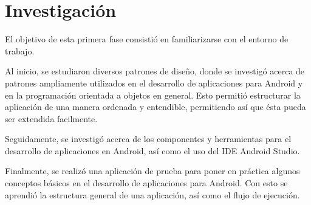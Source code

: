 \section{Investigación} \label{sect:Investigacion}

El objetivo de esta primera fase consistió en familiarizarse con el entorno de trabajo.

Al inicio, se estudiaron diversos patrones de diseño, donde se investigó acerca de patrones ampliamente utilizados en el desarrollo de aplicaciones para Android y en la programación orientada a objetos en general. Esto permitió estructurar la aplicación de una manera ordenada y entendible, permitiendo así que ésta pueda ser extendida facilmente.

Seguidamente, se investigó acerca de los componentes y herramientas para el desarrollo de aplicaciones en Android, así como el uso del IDE Android Studio.

Finalmente, se realizó una aplicación de prueba para poner en práctica algunos conceptos básicos en el desarrollo de aplicaciones para Android. Con esto se aprendió la estructura general de una aplicación, así como el flujo de ejecución.


